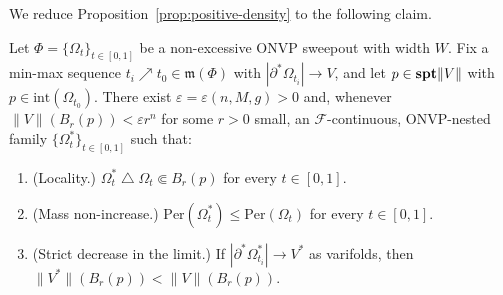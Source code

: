 We reduce Proposition~\ref{prop:positive-density} to the following claim.

\begin{claim}\label{claim:sweepout-replacement}
Let $\Phi = \{\Omega_t\}_{t\in[0,1]}$ be a non-excessive ONVP sweepout with width $W$. Fix a min-max sequence $t_i \nearrow t_0 \in \mathfrak{m}(\Phi)$ with $|\partial^*\Omega_{t_i}| \to V$, and let $p \in \mathbf{spt}\|V\|$ with $p \in \mathrm{int}(\Omega_{t_0})$. There exist $\varepsilon = \varepsilon(n, M, g) > 0$ and, whenever $\|V\|(B_r(p)) < \varepsilon r^n$ for some $r > 0$ small, an $\mathcal{F}$-continuous, ONVP-nested family $\{\Omega^*_t\}_{t\in[0,1]}$ such that:
\begin{enumerate}[label=\textup{(\arabic*)}, leftmargin=2em]
    \item \textup{(Locality.)} $\Omega^*_t \mathbin{\triangle} \Omega_t \Subset B_r(p)$ for every $t \in [0,1]$.
    \item \textup{(Mass non-increase.)} $\mathrm{Per}(\Omega^*_t) \le \mathrm{Per}(\Omega_t)$ for every $t \in [0,1]$.
    \item \textup{(Strict decrease in the limit.)} If $|\partial^*\Omega^*_{t_i}| \to V^*$ as varifolds, then $\|V^*\|(B_r(p)) < \|V\|(B_r(p))$.
\end{enumerate}
\end{claim}


